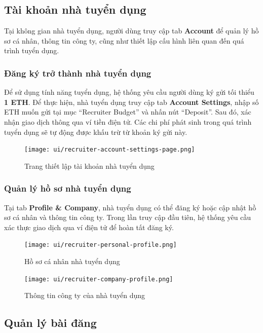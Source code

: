 \subsection{Tài khoản nhà tuyển dụng}

Tại không gian nhà tuyển dụng, người dùng truy cập tab \textbf{Account} để quản lý hồ sơ cá nhân, thông tin công ty, cũng như thiết lập cấu hình liên quan đến quá trình tuyển dụng.

\subsubsection{Đăng ký trở thành nhà tuyển dụng}

Để sử dụng tính năng tuyển dụng, hệ thống yêu cầu người dùng ký gửi tối thiểu \textbf{1 ETH}.  
Để thực hiện, nhà tuyển dụng truy cập tab \textbf{Account Settings}, nhập số ETH muốn gửi tại mục ``Recruiter Budget'' và nhấn nút ``Deposit''.  
Sau đó, xác nhận giao dịch thông qua ví tiền điện tử.  
Các chi phí phát sinh trong quá trình tuyển dụng sẽ tự động được khấu trừ từ khoản ký gửi này.

\begin{figure}[H]
  \centering
  \texttt{[image: ui/recruiter-account-settings-page.png]}
  \caption{Trang thiết lập tài khoản nhà tuyển dụng}
  \label{fig:recruiter-account-settings-page}
\end{figure}

\subsubsection{Quản lý hồ sơ nhà tuyển dụng}

Tại tab \textbf{Profile \& Company}, nhà tuyển dụng có thể đăng ký hoặc cập nhật hồ sơ cá nhân và thông tin công ty.  
Trong lần truy cập đầu tiên, hệ thống yêu cầu xác thực giao dịch qua ví điện tử để hoàn tất đăng ký.

\begin{figure}[H]
  \centering
  \texttt{[image: ui/recruiter-personal-profile.png]}
  \caption{Hồ sơ cá nhân nhà tuyển dụng}
  \label{fig:recruiter-personal-profile}
\end{figure}

\begin{figure}[H]
  \centering
  \texttt{[image: ui/recruiter-company-profile.png]}
  \caption{Thông tin công ty của nhà tuyển dụng}
  \label{fig:recruiter-company-profile}
\end{figure}

\subsection{Quản lý bài đăng}

